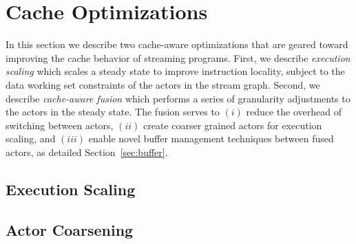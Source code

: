 \section{Cache Optimizations}
\label{sec:cache-opt}

In this section we describe two cache-aware optimizations that
are geared toward improving the cache behavior of streaming programs. First, we
describe {\it execution scaling} which 
scales a steady state to improve instruction locality, subject to the
data working set constraints of the actors in the stream graph.
Second, we describe {\it cache-aware fusion} which performs a series
of granularity adjustments to the actors in the steady state. The
fusion serves to $(i)$ reduce
the overhead of switching between actors, $(ii)$ create coarser
grained actors for execution scaling, and $(iii)$ enable novel
buffer management techniques between fused actors, as detailed
Section~\ref{sec:buffer}.

\subsection{Execution Scaling}


\subsection{Actor Coarsening}
